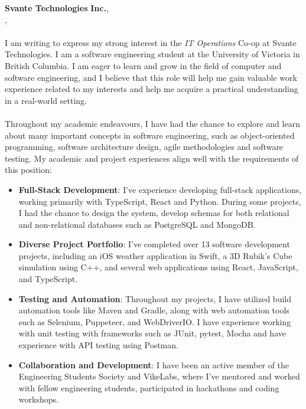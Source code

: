 \documentclass[a4paper, 12pt, oneside]{letter}
\newcommand{\Position}{IT Operations}
\newcommand{\CompanyName}{Svante Technologies}
\newcommand{\CompanyNameSuffix}{Inc.}
\newcommand{\Division}{Burnaby HQ}
\newcommand{\LocationCity}{Burnaby}
\newcommand{\LocationState}{British Columbia}
\begin{document}
\vspace{1em}
\textbf{\CompanyName}\textbf{ \CompanyNameSuffix},
\text{\Division}\\
\vspace{20pt}\text{\LocationCity}, \text{\LocationState} \\
\vspace{10pt} \\
 I am writing to express my strong interest in the \textit{\Position} Co-op at \CompanyName. I am a software engineering student at the University of Victoria in British Columbia. I am eager to learn and grow in the field of computer and software engineering, and I believe that this role will help me gain valuable work experience related to my interests and help me acquire a practical understanding in a real-world setting. \vspace{-7pt}\\\\
Throughout my academic endeavours, I have had the chance to explore and learn about many important concepts in software engineering, such as object-oriented programming, software architecture design, agile methodologies and software testing. My academic and project experiences align well with the requirements of this position: 
\begin{itemize}
	\item \textbf{Full-Stack Development}: I've experience developing full-stack applications, working primarily with TypeScript, React and Python. During some projects, I had the chance to design the system, develop schemas for both relational and non-relational databases such as {PostgreSQL} and {MongoDB}.

	\item \textbf{Diverse Project Portfolio}: I've completed over 13 software development projects, including an iOS weather application in Swift, a 3D Rubik's Cube simulation using C++, and several web applications using React, JavaScript, and TypeScript.

	\item \textbf{Testing and Automation}: Throughout my projects, I have utilized build automation tools like Maven and Gradle, along with web automation tools such as Selenium, Puppeteer, and WebDriverIO. I have experience working with unit testing with frameworks such as JUnit, pytest, Mocha and have experience with API testing using Postman.

	\item \textbf{Collaboration and Development}: I have been an active member of the Engineering Students Society and VikeLabs, where I've mentored and worked with fellow engineering students, participated in hackathons and coding workshops.
\end{itemize}
\end{document}
